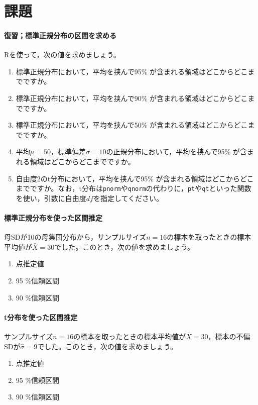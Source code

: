 \documentclass{ltjsbook}
\begin{document}
\section{課題}
\paragraph{復習；標準正規分布の区間を求める}
Rを使って，次の値を求めましょう。
\begin{enumerate}
	\item 標準正規分布において，平均を挟んで95\% が含まれる領域はどこからどこまでですか。
	\item 標準正規分布において，平均を挟んで90\% が含まれる領域はどこからどこまでですか。
	\item 標準正規分布において，平均を挟んで50\% が含まれる領域はどこからどこまでですか。
	\item 平均$\mu=50$，標準偏差$\sigma = 10$の正規分布において，平均を挟んで95\% が含まれる領域はどこからどこまでですか。
	\item 自由度2のt分布において，平均を挟んで95\% が含まれる領域はどこからどこまでですか。なお，t分布は\texttt{pnorm}や\texttt{qnorm}の代わりに，\texttt{pt}や\texttt{qt}といった関数を使い，引数に自由度$df$を指定してください。
\end{enumerate}

\paragraph{標準正規分布を使った区間推定}
母SDが10の母集団分布から，サンプルサイズ$n=16$の標本を取ったときの標本平均値が$\bar{X}=30$でした。このとき，次の値を求めましょう。
\begin{enumerate}
	\item 点推定値
	\item 95 \%信頼区間
	\item 90 \%信頼区間
\end{enumerate}

\paragraph{t分布を使った区間推定}
サンプルサイズ$n=16$の標本を取ったときの標本平均値が$\bar{X}=30$，標本の不偏SDが$\hat{\sigma}=9$でした。このとき，次の値を求めましょう。
\begin{enumerate}
	\item 点推定値
	\item 95 \%信頼区間
	\item 90 \%信頼区間
\end{enumerate}
\end{document}
